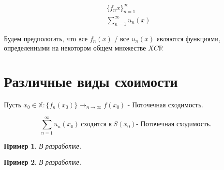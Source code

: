 \documentclass[12pt, oneside]{article}
\theoremstyle{plain}
\newtheorem{Example}{Пример}
\begin{document}
\begin{minipage}{0.25\textwidth}
	\begin{equation}\nonumber
	\begin{split}
		& \{f_n{x}\}_{n=1}^\infty \\
		& \sum_{n=1}^\infty u_n(x)
	\end{split}
	\end{equation}
\end{minipage}
\hfill
\begin{minipage}{0.65\textwidth}
	Будем предпологать, что все \(f_n(x)\) / все \(u_n(x)\)
	являются функциями, определенными на некотором общем множестве \(X C \mathbb{R}\)
\end{minipage}
\section{Различные виды схоимости}
Пусть \(x_0 \in \mathbb{X}: \{f_n(x_0)\} \to_{n\to\infty} f(x_0)\) - Поточечная
сходимость.

\begin{equation}\nonumber
	\sum_{n=1}^{\infty} u_n(x_0)\ \text{сходится к}\ S(x_0) \text{- Поточечная сходимость.}
\end{equation}
\begin{Example} 
	В разработке.
\end{Example}
\begin{Example}
	В разработке.
\end{Example}
\end{document}
